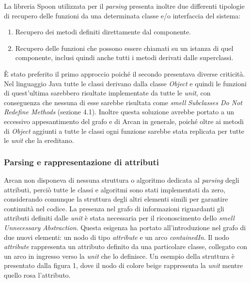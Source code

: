             La libreria Spoon \cite{pawlak:hal-01169705} utilizzata per il \textit{parsing} presenta inoltre due differenti tipologie di recupero delle funzioni da una determinata classe e/o interfaccia del sistema:
            \begin{enumerate}
                \item Recupero dei metodi definiti direttamente dal componente.
                
                \item Recupero delle funzioni che possono essere chiamati su un istanza di quel componente, inclusi quindi anche tutti i metodi derivati dalle superclassi.
            \end{enumerate}
            È stato preferito il primo approccio poiché il secondo presentava diverse criticità. Nel linguaggio Java tutte le classi derivano dalla classe \textit{Object} e quindi le funzioni di quest'ultima sarebbero risultate implementate da tutte le \textit{unit}, con conseguenza che nessuna di esse sarebbe risultata come \textit{smell} \textit{Subclasses Do Not Redefine Methods} (sezione 4.1). Inoltre questa soluzione avrebbe portato a un eccessivo appesantimento del grafo e di Arcan in generale, poiché oltre ai metodi di \textit{Object} aggiunti a tutte le classi ogni funzione sarebbe stata replicata per tutte le \textit{unit} che la ereditano.
        
        
        \subsubsection{Parsing e rappresentazione di attributi}
            Arcan non disponeva di nessuna struttura o algoritmo dedicata al \textit{parsing} degli attributi, perciò tutte le classi e algoritmi sono stati implementati da zero, considerando comunque la struttura degli altri elementi simili per garantire continuità nel codice.
            La presenza nel grafo di informazioni riguardanti gli attributi definiti dalle \textit{unit} è stata necessaria per il riconoscimento dello \textit{smell} \textit{Unnecessary Abstraction}.
            Questa esigenza ha portato all'introduzione nel grafo di due nuovi elementi: un nodo di tipo \textit{attribute} e un arco \textit{containedIn}. Il nodo \textit{attribute} rappresenta un attributo definito da una particolare classe, collegato con un arco in ingresso verso la \textit{unit} che lo definisce. Un esempio della struttura è presentato dalla figura 1, dove il nodo di colore beige rappresenta la \textit{unit} mentre quello rosa l'attributo.
            
